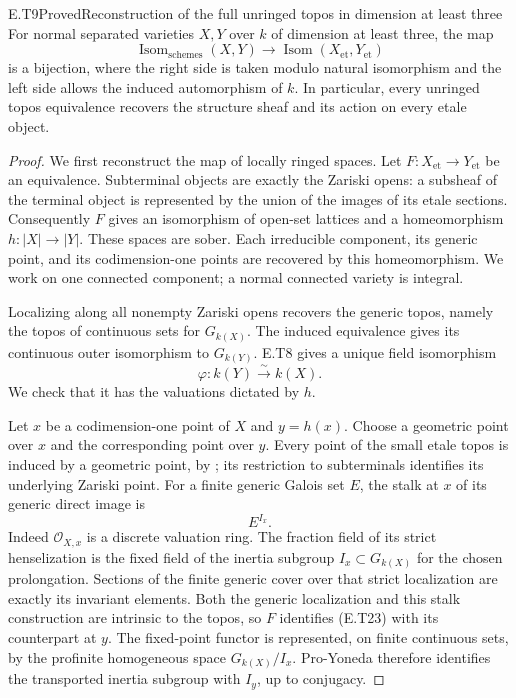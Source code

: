 \begin{result}{E.T9}{Proved}{Reconstruction of the full unringed topos in dimension at least three}
For normal separated varieties $X,Y$ over $k$ of dimension at least
three, the map
\[
 \operatorname{Isom}_{\mathrm{schemes}}(X,Y)
   \longrightarrow
 \operatorname{Isom}(X_{\mathrm{et}},Y_{\mathrm{et}})
                                                               \tag{E.T35}
\]
is a bijection, where the right side is taken modulo natural
isomorphism and the left side allows the induced automorphism
of $k$.  In particular, every unringed topos equivalence recovers
the structure sheaf and its action on every etale object.
\end{result}
\begin{proof}
We first reconstruct the map of locally ringed spaces.  Let
$F:X_{\mathrm{et}}\to Y_{\mathrm{et}}$ be an equivalence.
Subterminal objects are exactly the Zariski opens: a subsheaf
of the terminal object is represented by the union of the
images of its etale sections.  Consequently $F$ gives an
isomorphism of open-set lattices and a homeomorphism
$h:|X|\to|Y|$.  These spaces are sober.  Each irreducible
component, its generic point, and its codimension-one points
are recovered by this homeomorphism.  We work on one connected
component; a normal connected variety is integral.

Localizing along all nonempty Zariski opens recovers the generic
topos, namely the topos of continuous sets for $G_{k(X)}$.
The induced equivalence gives its continuous outer isomorphism
to $G_{k(Y)}$.  E.T8 gives a unique field isomorphism
\[
                \varphi:k(Y)\xrightarrow{\sim}k(X).          \tag{E.T22}
\]
We check that it has the valuations dictated by $h$.

Let $x$ be a codimension-one point of $X$ and $y=h(x)$.
Choose a geometric point over $x$ and the corresponding point
over $y$.  Every point of the small etale topos is induced by
a geometric point, by \cite[Lemma 59.29.12]{StacksEtalePoints};
its restriction to subterminals identifies its underlying
Zariski point.  For a finite generic Galois set $E$, the stalk at
$x$ of its generic direct image is
\[
                         E^{I_x}.                          \tag{E.T23}
\]
Indeed $\mathcal O_{X,x}$ is a discrete valuation ring.
The fraction field of its strict henselization is the fixed
field of the inertia subgroup $I_x\subset G_{k(X)}$ for the
chosen prolongation.  Sections of the finite generic cover
over that strict localization are exactly its invariant
elements.  Both the generic localization and this stalk
construction are intrinsic to the topos, so $F$ identifies
(E.T23) with its counterpart at $y$.
The fixed-point functor is represented, on finite continuous
sets, by the profinite homogeneous space $G_{k(X)}/I_x$.
Pro-Yoneda therefore identifies the transported inertia
subgroup with $I_y$, up to conjugacy.


\end{proof}
